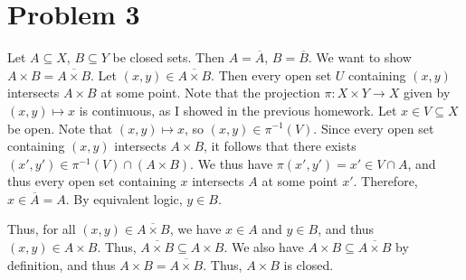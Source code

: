 \documentclass[11pt, letterpaper]{article}
\begin{document}
\section*{Problem 3}
Let $A\subseteq X$, $B\subseteq Y$ be closed sets. Then $A=\overline{A} $, $B=\overline{B} $. We want to show $A\times B=\overline{A\times B} $. Let $(x,y)\in \overline{A\times B} $. Then every open set $U$ containing $(x,y)$ intersects $A\times B$ at some point. Note that the projection $\pi : X\times Y \to X$ given by $(x,y)\mapsto x$ is continuous, as I showed in the previous homework. Let $x\in V\subseteq X$ be open. Note that $(x,y)\mapsto x$, so $(x,y)\in \pi ^{-1}(V)$. Since every open set containing $(x,y)$ intersects $A\times B$, it follows that there exists $(x',y')\in \pi ^{-1}(V)\cap (A\times B)$. We thus have $\pi(x',y')=x'\in V \cap A$, and thus every open set containing $x$ intersects $A$ at some point $x'$. Therefore, $x\in \overline{A} =A$. By equivalent logic, $y\in B$.

Thus, for all $(x,y)\in \overline{A\times B} $, we have $x\in A$ and $y\in B$, and thus $(x,y)\in A\times B$. Thus, $\overline{A\times B} \subseteq A\times B$. We also have $A\times B\subseteq \overline{A\times B} $ by definition, and thus $A\times B=\overline{A\times B} $. Thus, $A\times B$ is closed.
\end{document}
